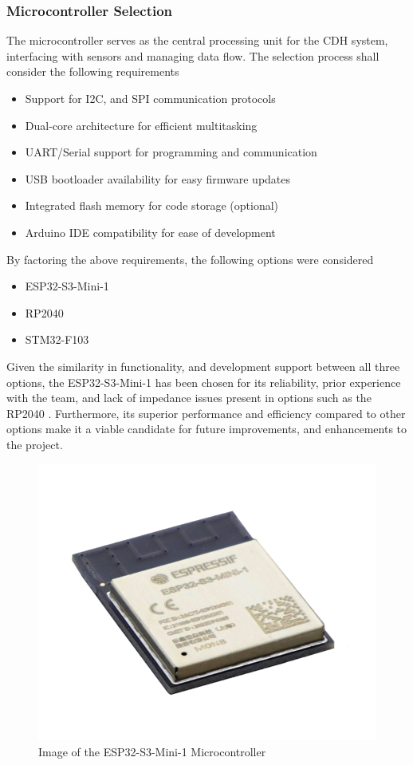 \documentclass{report}
\begin{document}
                \subsubsection{Microcontroller Selection}
                    The microcontroller serves as the central processing unit for the 
                    CDH system, interfacing with sensors and managing data flow.
                    The selection process shall consider the following requirements
                    \begin{itemize}
                        \item Support for I2C, and SPI communication protocols
                        \item Dual-core architecture for efficient multitasking 
                        \item UART/Serial support for programming and communication
                        \item USB bootloader availability for easy firmware updates
                        \item Integrated flash memory for code storage (optional)
                        \item Arduino IDE compatibility for ease of development
                    \end{itemize}
                    By factoring the above requirements, the following options
                    were considered
                    \begin{itemize}
                        \item ESP32-S3-Mini-1
                        \item RP2040
                        \item STM32-F103
                    \end{itemize}
                    Given the similarity in functionality, and development support between
                    all three options, the ESP32-S3-Mini-1 has been chosen for its reliability, 
                    prior experience with the team, and lack of impedance issues present in 
                    options such as the RP2040 \cite{rp2040datasheet}. Furthermore, its superior performance and efficiency
                    compared to other options make it a viable candidate for future improvements,
                    and enhancements to the project.
                    \begin{figure}[H]
                        \centering
                        \includegraphics[width=0.2\linewidth]{figures/MC_IMG.png}
                        \caption{Image of the ESP32-S3-Mini-1 Microcontroller}
                        \label{fig:mc_img}
                    \end{figure}
\end{document}
